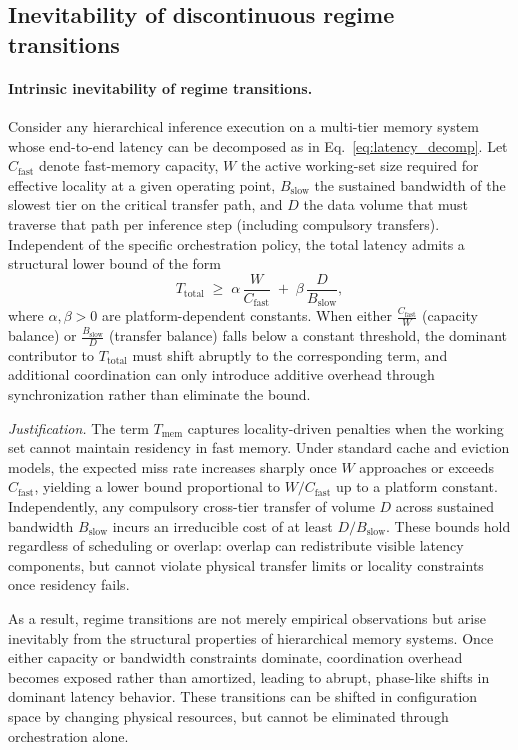 \subsection{Inevitability of discontinuous regime transitions}

\paragraph{Intrinsic inevitability of regime transitions.}
Consider any hierarchical inference execution on a multi-tier memory system whose end-to-end latency can be decomposed as in
Eq.~\eqref{eq:latency_decomp}. Let $C_{\mathrm{fast}}$ denote fast-memory capacity, $W$ the active working-set size required for
effective locality at a given operating point, $B_{\mathrm{slow}}$ the sustained bandwidth of the slowest tier on the critical
transfer path, and $D$ the data volume that must traverse that path per inference step (including compulsory transfers).
Independent of the specific orchestration policy, the total latency admits a structural lower bound of the form
\begin{equation}
T_{\mathrm{total}} \;\ge\; \alpha\,\frac{W}{C_{\mathrm{fast}}} \;+\; \beta\,\frac{D}{B_{\mathrm{slow}}},
\label{eq:lower_bound_regime}
\end{equation}
where $\alpha,\beta>0$ are platform-dependent constants.
When either $\frac{C_{\mathrm{fast}}}{W}$ (capacity balance) or $\frac{B_{\mathrm{slow}}}{D}$ (transfer balance) falls below a
constant threshold, the dominant contributor to $T_{\mathrm{total}}$ must shift abruptly to the corresponding term, and
additional coordination can only introduce additive overhead through synchronization rather than eliminate the bound.

\emph{Justification.}
The term $T_{\mathrm{mem}}$ captures locality-driven penalties when the working set cannot maintain residency in fast memory.
Under standard cache and eviction models, the expected miss rate increases sharply once $W$ approaches or exceeds
$C_{\mathrm{fast}}$, yielding a lower bound proportional to $W/C_{\mathrm{fast}}$ up to a platform constant.
Independently, any compulsory cross-tier transfer of volume $D$ across sustained bandwidth $B_{\mathrm{slow}}$ incurs an
irreducible cost of at least $D/B_{\mathrm{slow}}$.
These bounds hold regardless of scheduling or overlap: overlap can redistribute visible latency components, but cannot violate
physical transfer limits or locality constraints once residency fails.

As a result, regime transitions are not merely empirical observations but arise inevitably from the structural properties of
hierarchical memory systems. Once either capacity or bandwidth constraints dominate, coordination overhead becomes exposed rather
than amortized, leading to abrupt, phase-like shifts in dominant latency behavior. These transitions can be shifted in
configuration space by changing physical resources, but cannot be eliminated through orchestration alone.

